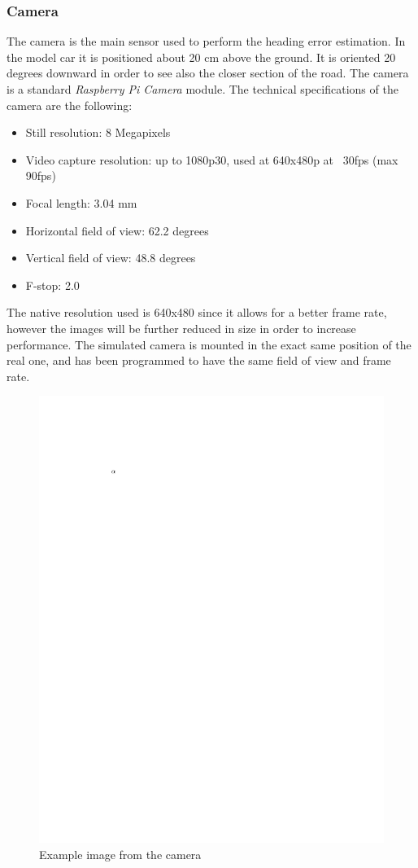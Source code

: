 \documentclass[a4paper,12pt,sort&compress]{article}
\begin{document}
    \subsubsection*{Camera}
    The camera is the main sensor used to perform the heading error estimation.
    In the model car it is positioned about 20 cm above the ground. It is oriented 20 degrees downward in order to see also the closer
    section of the road. The camera is a standard \textit{Raspberry Pi Camera}
    module. The technical specifications of the camera are the following:
    \begin{itemize}
        \item Still resolution: 8 Megapixels
        \item Video capture resolution: up to 1080p30, used at 640x480p at
        ~30fps (max 90fps)
        \item Focal length: 3.04 mm
        \item Horizontal field of view: 62.2 degrees
        \item Vertical field of view: 48.8 degrees
        \item F-stop: 2.0
    \end{itemize}
    The native resolution used is 640x480 since it allows for a better
    frame rate, however the images will be further reduced in size in order to
    increase performance. The simulated camera is mounted in the exact same
    position of the real one, and has been programmed to have the same field of
    view and frame rate.  

    \begin{figure}
        \centering
        \includegraphics[width=0.6\linewidth]{a.pdf}
        \caption{Example image from the camera}
        \label{fig:camera_example}
    \end{figure}
    
\end{document}
